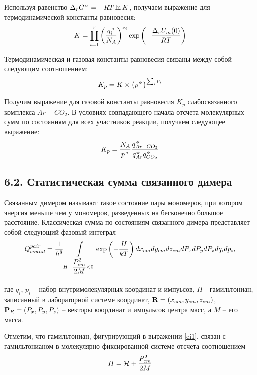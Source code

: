 Используя равенство $\Delta_r G^{\barcirc} = - RT \ln K$, получаем выражение для термодинамической константы равновесия:
\vverh
\begin{gather}
	K = \prod_{i = 1}^{r} \lb \frac{q_i^{\barcirc}}{N_A} \rb^{\nu_i} \exp \lb - \frac{\Delta_r U_m (0)}{RT} \rb \notag
\end{gather}

Термодинамическая и газовая константы равновесия связаны между собой следующим соотношением: 
\vverh
\begin{gather}
	K_p =  K \times \lb p^{\barcirc} \rb^{\sum_i \nu_i} \notag 
\end{gather}

Получим выражение для газовой константы равновесия $K_p$ слабосвязанного комплекса $Ar-CO_2$. В условиях совпадающего начала отсчета молекулярных сумм по состояниям для всех участников реакции, получаем следующее выражение:
\vverh
\begin{gather}
	K_p = \frac{N_A}{p^{\barcirc}} \frac{q_{Ar-CO_2}^{\barcirc}}{q_{Ar}^{\barcirc} q_{CO_2}^{\barcirc}} \label{eqconst}
\end{gather}

\subsection*{\textbf{6.2.} Статистическая сумма связанного димера} 

Связанным димером называют такое состояние пары мономеров, при котором энергия меньше чем у мономеров, разведенных на бесконечно большое расстояние. Классическая сумма по состояниям связанного димера представляет собой следующий фазовый интеграл
\vverh
\begin{gather}
	Q_{bound}^{pair} = \frac{1}{h^8} \int\limits_{H - \frac{\displaystyle \strut P_{cm}^2}{\displaystyle \strut 2 M} < 0} \exp \left( - \frac{H}{k T} \right) d x_{cm} d y_{cm} d z_{cm} d P_{x} d P_{y} d P_{z} d q_i d p_i, \label{ci1}
\end{gather}

где $q_i$, $p_i$ -- набор внутримолекулярных координат и импуьсов, $H$ - гамильтониан, записанный в лабораторной системе координат, $\mathbf{R} = \left( x_{cm}, y_{cm}, z_{cm} \right)$, $\mathbf{P}_R = \left( P_x, P_y, P_z \right)$ -- векторы координат и импульсов центра масс, а $M$ -- его масса. \par
Отметим, что гамильтониан, фигурирующий в выражении \eqref{ci1}, связан с гамильтонианом в молекулярно-фиксированной системе отсчета соотношением
\vverh
\begin{gather}
	H = \mathcal{H} + \frac{P_{cm}^2}{2 M} \notag
\end{gather}

